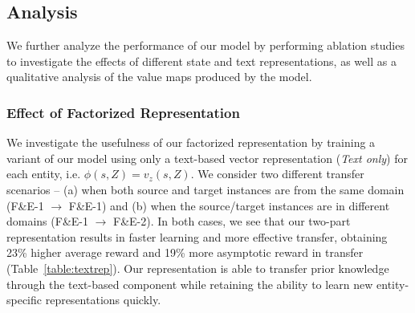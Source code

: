 




\subsection{Analysis}
We further analyze the performance of our model by performing ablation studies to investigate the effects of different state and text representations, as well as a qualitative analysis of the value maps produced by the model.

\subsubsection{Effect of Factorized Representation}
We investigate the usefulness of our factorized representation by training a variant of our model using only a text-based vector representation (\emph{Text only}) for each entity, i.e. $\phi(s, Z) = v_z(s, Z)$.
We consider two different transfer scenarios -- (a) when both source and target instances are from the same domain (F\&E-1 $\rightarrow$ F\&E-1) and (b) when the source/target instances are in different domains (F\&E-1 $\rightarrow$ F\&E-2).
 In both cases, we see that our two-part representation results in faster learning and more effective transfer, obtaining 23\% higher average reward and 19\% more asymptotic reward in  transfer (Table~\ref{table:textrep}). Our  representation is able to transfer prior knowledge through the text-based component while retaining the ability to learn new entity-specific representations quickly.

